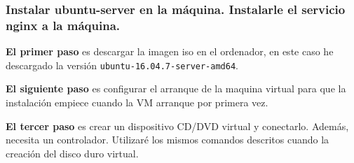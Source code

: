 \subsubsection{Instalar ubuntu-server en la máquina. Instalarle el servicio nginx a la máquina.}
\par \textbf{El primer paso} es descargar la imagen iso en el ordenador, en este caso he descargado
la versión \texttt{ubuntu-16.04.7-server-amd64}.
\par \textbf{El siguiente paso} es configurar el arranque de la maquina virtual para que 
la instalación empiece cuando la VM arranque por primera vez. 
\par \textbf{El tercer paso} es crear un dispositivo CD/DVD virtual y conectarlo. Además, 
necesita un controlador. Utilizaré los mismos comandos descritos cuando la creación del disco duro virtual.

